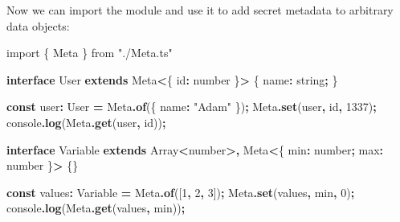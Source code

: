 \documentclass[
]{book}
\newenvironment{Shaded}{\begin{snugshade}}{\end{snugshade}}
\newcommand{\BuiltInTok}[1]{#1}
\newcommand{\DataTypeTok}[1]{\textcolor[rgb]{0.13,0.29,0.53}{#1}}
\newcommand{\DecValTok}[1]{\textcolor[rgb]{0.00,0.00,0.81}{#1}}
\newcommand{\FunctionTok}[1]{\textcolor[rgb]{0.13,0.29,0.53}{\textbf{#1}}}
\newcommand{\ImportTok}[1]{#1}
\newcommand{\KeywordTok}[1]{\textcolor[rgb]{0.13,0.29,0.53}{\textbf{#1}}}
\newcommand{\NormalTok}[1]{#1}
\newcommand{\OperatorTok}[1]{\textcolor[rgb]{0.81,0.36,0.00}{\textbf{#1}}}
\newcommand{\StringTok}[1]{\textcolor[rgb]{0.31,0.60,0.02}{#1}}
\newcommand{\VerbatimStringTok}[1]{\textcolor[rgb]{0.31,0.60,0.02}{#1}}
\theoremstyle{definition}
\theoremstyle{definition}
\theoremstyle{definition}
\theoremstyle{definition}
\theoremstyle{remark}
\begin{document}
Now we can import the module and use it to add secret metadata to arbitrary data objects:

\begin{Shaded}
\begin{Highlighting}[]
\ImportTok{import}\NormalTok{ \{ Meta \} }\ImportTok{from} \StringTok{"./Meta.ts"}

\KeywordTok{interface}\NormalTok{ User }\KeywordTok{extends}\NormalTok{ Meta}\OperatorTok{\textless{}}\NormalTok{\{ id}\OperatorTok{:} \DataTypeTok{number}\NormalTok{ \}}\OperatorTok{\textgreater{}}\NormalTok{ \{}
\NormalTok{  name}\OperatorTok{:} \DataTypeTok{string}\OperatorTok{;}
\NormalTok{\}}

\KeywordTok{const}\NormalTok{ user}\OperatorTok{:}\NormalTok{ User }\OperatorTok{=}\NormalTok{ Meta}\OperatorTok{.}\FunctionTok{of}\NormalTok{(\{ name}\OperatorTok{:} \StringTok{"Adam"}\NormalTok{ \})}\OperatorTok{;}
\NormalTok{Meta}\OperatorTok{.}\FunctionTok{set}\NormalTok{(user}\OperatorTok{,} \VerbatimStringTok{\textasciigrave{}id\textasciigrave{}}\OperatorTok{,} \DecValTok{1337}\NormalTok{)}\OperatorTok{;}
\BuiltInTok{console}\OperatorTok{.}\FunctionTok{log}\NormalTok{(Meta}\OperatorTok{.}\FunctionTok{get}\NormalTok{(user}\OperatorTok{,} \VerbatimStringTok{\textasciigrave{}id\textasciigrave{}}\NormalTok{))}\OperatorTok{;}

\KeywordTok{interface}\NormalTok{ Variable }\KeywordTok{extends} \BuiltInTok{Array}\OperatorTok{\textless{}}\DataTypeTok{number}\OperatorTok{\textgreater{},}\NormalTok{ Meta}\OperatorTok{\textless{}}\NormalTok{\{ min}\OperatorTok{:} \DataTypeTok{number}\OperatorTok{;}\NormalTok{ max}\OperatorTok{:} \DataTypeTok{number}\NormalTok{ \}}\OperatorTok{\textgreater{}}\NormalTok{ \{\}}

\KeywordTok{const}\NormalTok{ values}\OperatorTok{:}\NormalTok{ Variable }\OperatorTok{=}\NormalTok{ Meta}\OperatorTok{.}\FunctionTok{of}\NormalTok{([}\DecValTok{1}\OperatorTok{,} \DecValTok{2}\OperatorTok{,} \DecValTok{3}\NormalTok{])}\OperatorTok{;}
\NormalTok{Meta}\OperatorTok{.}\FunctionTok{set}\NormalTok{(values}\OperatorTok{,} \VerbatimStringTok{\textasciigrave{}min\textasciigrave{}}\OperatorTok{,} \DecValTok{0}\NormalTok{)}\OperatorTok{;}
\BuiltInTok{console}\OperatorTok{.}\FunctionTok{log}\NormalTok{(Meta}\OperatorTok{.}\FunctionTok{get}\NormalTok{(values}\OperatorTok{,} \VerbatimStringTok{\textasciigrave{}min\textasciigrave{}}\NormalTok{))}\OperatorTok{;}
\end{Highlighting}
\end{Shaded}
\end{document}
